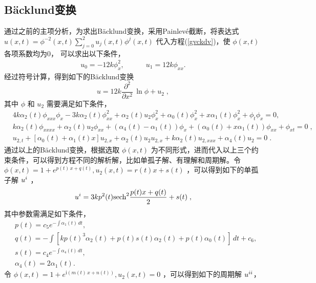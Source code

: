 \subsection{B\"{a}cklund变换}
通过之前的主项分析，为求出B\"{a}cklund变换，采用Painlev\'{e}截断，将表达式$u(x,t)=\phi^{-2}(x,t)\sum\limits_{j=0}^{2}u_j(x,t)\phi^{j}(x,t)$ 代入方程(\ref{gvckdv})，使 $\phi(x,t)$ 各项系数均为0， 可以求出以下条件，
\begin{align}
u_0=-12 k \phi _x^2,
\quad\quad\quad
u_1=12 k \phi _{xx}. \label{BTphi-4}
\end{align}
经过符号计算，得到如下的B\"{a}cklund变换
\begin{equation}
u = 12k\frac{\partial^{2}}{\partial
x^{2}}\, \ln \phi +u_2
 \; ,  \label{BT}
\end{equation}
其中 $\phi$ 和 $u_2$ 需要满足如下条件，
\begin{align}
& 4 k \alpha _2(t) \phi_{xxx} \phi_x-3 k \alpha _2(t) \phi_{xx}^2+\alpha _2(t) u_2 \phi_x^2+\alpha _0(t) \phi_x^2+x \alpha _1(t) \phi_x^2+\phi_t \phi_x=0,
 \;  \label{BT-1}\\
& k \alpha _2(t) \phi_{xxxx}+\alpha _2(t) u_2 \phi_{xx}+\left(\alpha _4(t)-\alpha _1(t)\right) \phi_x+\left(\alpha _0(t)+x \alpha _1(t)\right) \phi_{xx}+\phi_{xt}=0
 \;,   \label{BT-2}\\
& u_{2,t} + [\alpha _0(t)+\alpha _1(t)x] u_{2,x}+\alpha _2(t) u_2 u_{2,x} + k \alpha _2(t) u_{2,xxx}+\alpha _4(t) u_2=0
 \;  . \label{BT-3}
\end{align}
通过以上的B\"{a}cklund变换，根据选取 $\phi(x,t)$ 为不同形式，进而代入以上三个约束条件，可以得到方程不同的解析解，比如单孤子解、有理解和周期解。令 $\phi(x,t)=1+ e^{p(t)\,x + q(t)}, u_2(x,t)=r(t) x+s(t)$ ，可以得到如下的单孤子解 $u^{\uppercase\expandafter{\romannumeral 1}}$ ，
\begin{equation}
 u^{\uppercase\expandafter{\romannumeral 1}}= 3 k p^2(t) \text{sech}^2\frac{p(t)x+q(t)}{2}+s(t)
 \;  , \label{BT-s8}
\end{equation}
其中参数需满足如下条件，
\begin{align}
& p(t)=c_5 e^{-\int \alpha _1(t) \, dt}
,  \label{BT-s3}\\
& q(t)=-\int \left[k p(t)^3 \alpha _2(t)+p(t) s(t) \alpha _2(t)+p(t) \alpha _0(t)\right] \, dt+c_6
  , \label{BT-s4}\\
& s(t)=c_4 e^{-\int \alpha _4(t) \, dt}
,  \label{BT-s5}\\
& \alpha _4(t)=2 \alpha _1(t). \label{BT-s7}
\end{align}
令 $\phi(x,t)=1+ e^{\mbox{i}(m(t)\,x + n(t))}, u_2(x,t)=0$ ，可以得到如下的周期解 $u^{\uppercase\expandafter{\romannumeral 2}}$，
